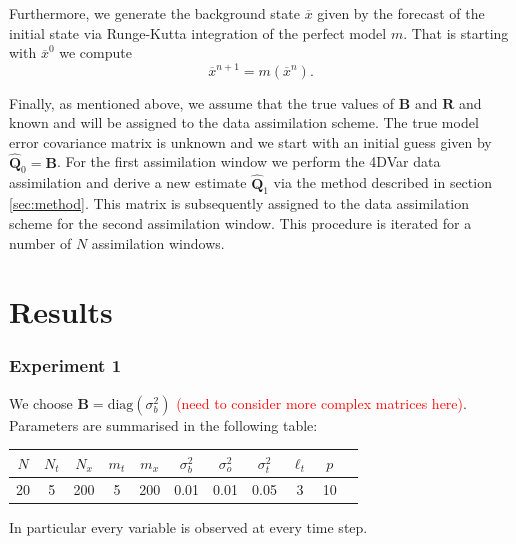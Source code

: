 \documentclass[a4paper,10pt]{article}
\numberwithin{equation}{section}
\begin{document}
Furthermore, we generate the background state $\overline x$ given by the forecast of the initial state via Runge-Kutta integration of the perfect model $m$. That is starting with $\overline x^0$ we compute 
\begin{equation}
\overline x^{n+1}=m(\overline x^n).
\end{equation}

Finally, as mentioned above, we assume that the true values of  ${\mathbf B}$ and ${\mathbf R}$ and known and will be assigned to the data assimilation scheme. The true model error covariance matrix is unknown and we start with an initial guess given by $\hat{\mathbf Q}_0=\mathbf B$. For the first assimilation window we perform the 4DVar data assimilation and derive a new estimate $\hat{\mathbf Q}_1$ via the method described in section \ref{sec:method}. This matrix is subsequently assigned to the data assimilation scheme for the second assimilation window. This procedure is iterated for a number of $N$ assimilation windows. 

\newpage
\section{Results}

\subsubsection*{Experiment 1}
We choose  ${\mathbf B}=\text{diag}(\sigma_b^2)$ \textcolor{red}{(need to consider more complex matrices here)}. Parameters are summarised in the following table: 
\begin{table}[H]
\begin{center}
\begin{tabular}{ |c|c|c|c|c|c|c|c|c|c|c|} 
 \hline
$ N$& $N_t$& $N_x$&$m_t$&$m_x$&$\sigma_b^2$&$\sigma_o^2$&$\sigma_t^2$&$\ell_t$&$p$\\ 
 \hline
20 &     5& 200&  5 & 200&0.01&0.01&0.05&3&10 \\
\hline
\end{tabular}
\end{center}
\end{table}
In particular every variable is observed at every time step. 
\end{document}
